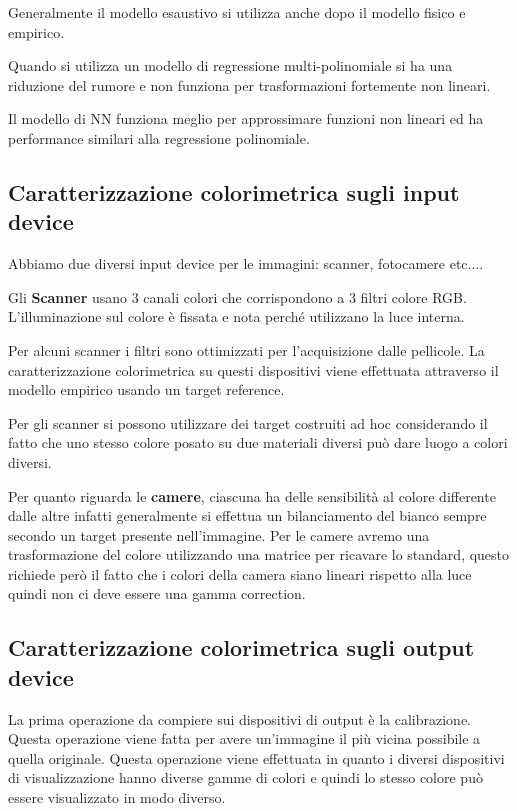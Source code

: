 Generalmente il modello esaustivo si utilizza anche dopo il modello fisico e empirico.
\begin{nota}
    Quando si utilizza un modello di regressione multi-polinomiale si ha una 
    riduzione del rumore e non funziona per trasformazioni fortemente non lineari.
\end{nota}
\begin{nota}
    Il modello di NN funziona meglio per approssimare funzioni non lineari ed ha
    performance similari alla regressione polinomiale.
\end{nota}
\subsection{Caratterizzazione colorimetrica sugli input device}
Abbiamo due diversi input device per le immagini: scanner, fotocamere etc$\dots$.

Gli \textbf{Scanner} usano $3$ canali colori che corrispondono a 3 filtri colore 
RGB. L'illuminazione sul colore è fissata e nota perché utilizzano la luce interna.

Per alcuni scanner i filtri sono ottimizzati per l'acquisizione dalle pellicole.
La caratterizzazione colorimetrica su questi dispositivi viene effettuata attraverso
il modello empirico usando un target reference.

Per gli scanner si possono utilizzare dei target costruiti ad hoc considerando il 
fatto che uno stesso colore posato su due materiali diversi può dare luogo a colori
diversi.

Per quanto riguarda le \textbf{camere}, ciascuna ha delle sensibilità al colore
differente dalle altre infatti generalmente si effettua un bilanciamento del bianco
sempre secondo un target presente nell'immagine. Per le camere avremo una 
trasformazione del colore utilizzando una matrice per ricavare lo standard, questo
richiede però il fatto che i colori della camera siano lineari rispetto alla luce
quindi non ci deve essere una gamma correction.

\subsection{Caratterizzazione colorimetrica sugli output device}
La prima operazione da compiere sui dispositivi di output è la calibrazione. 
Questa operazione viene fatta per avere un'immagine il più vicina possibile a 
quella originale. Questa operazione viene effettuata in quanto i diversi 
dispositivi di visualizzazione hanno diverse gamme di colori e quindi lo stesso
colore può essere visualizzato in modo diverso.


